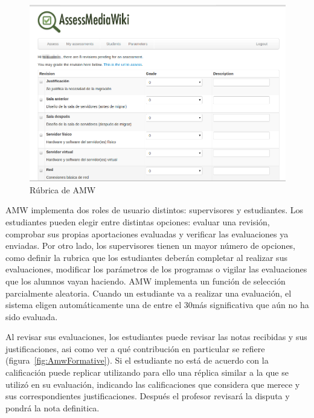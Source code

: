 \begin{figure}
  \begin{center}
    \includegraphics[scale=0.3]{AmwRubrica.png}
  \end{center}
  \caption{Rúbrica de AMW}
  \label{fig:AmwRubrica}
\end{figure}

AMW implementa dos roles de usuario distintos: supervisores y estudiantes. Los estudiantes pueden elegir entre distintas opciones: evaluar una revisión, comprobar sus propias aportaciones evaluadas y verificar las evaluaciones ya enviadas. Por otro lado, los supervisores tienen un mayor número de opciones, como definir la rubrica que los estudiantes deberán completar al realizar sus evaluaciones, modificar los parámetros de los programas o vigilar las evaluaciones que los alumnos vayan haciendo. AMW implementa un función de selección parcialmente aleatoria. Cuando un estudiante va a realizar una evaluación, el sistema eligen automáticamente una de entre el 30\percentage más significativa que aún no ha sido evaluada.

Al revisar sus evaluaciones, los estudiantes puede revisar las notas recibidas y sus justificaciones, asi como ver a qué contribución en particular se refiere (figura~\ref{fig:AmwFormative}). Si el estudiante no está de acuerdo con la calificación puede replicar utilizando para ello una réplica similar a la que se utilizó en su evaluación, indicando las calificaciones que considera que merece y sus correspondientes justificaciones. Después el profesor revisará la disputa y pondrá la nota definitica.

